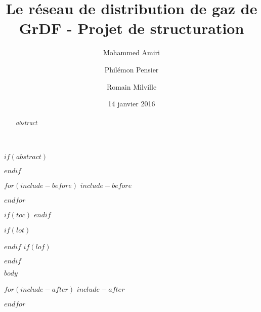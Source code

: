\documentclass[
$if(fontsize)$$fontsize$,$endif$
french,                           %
$if(papersize)$$papersize$,$endif$
$for(classoption)$$classoption$$sep$,$endfor$]{$documentclass$}
\title{ Le réseau de distribution de gaz de GrDF - Projet de structuration }
\author{ Mohammed Amiri\and Philémon Pensier \and Romain Milville}
\date{14 janvier 2016}
\begin{document}
\maketitle

\clearpage

$if(abstract)$
\begin{abstract}
$abstract$
\end{abstract}
$endif$

$for(include-before)$
$include-before$

$endfor$

$if(toc)$
{
  \hypersetup{linkcolor=$if(toccolor)$$toccolor$$else$black$endif$}
  \setcounter{tocdepth}{3}
  \tableofcontents
}
$endif$

$if(lot)$
\listoftables
$endif$
$if(lof)$
\listoffigures
$endif$

\clearpage
$body$

$for(include-after)$
$include-after$

$endfor$
\end{document}
